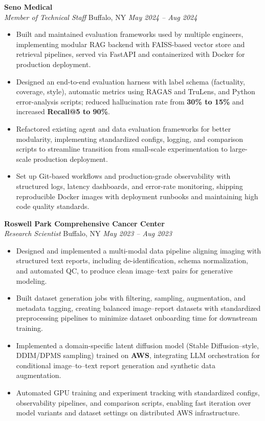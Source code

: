\vspace*{-1pt}
\item \textbf{Seno Medical}\\
\textit{Member of Technical Staff} \hfill Buffalo, NY \quad \textit{May 2024 -- Aug 2024}
\vspace*{-3pt}
\begin{itemize}[leftmargin=0.2in, topsep=1pt]
  \item Built and maintained evaluation frameworks used by multiple engineers, implementing modular RAG backend with FAISS-based vector store and retrieval pipelines, served via FastAPI and containerized with Docker for production deployment.
  \item Designed an end-to-end evaluation harness with label schema (factuality, coverage, style), automatic metrics using RAGAS and TruLens, and Python error-analysis scripts; reduced hallucination rate from \textbf{30\% to 15\%} and increased \textbf{Recall@5 to 90\%}.
  \item Refactored existing agent and data evaluation frameworks for better modularity, implementing standardized configs, logging, and comparison scripts to streamline transition from small-scale experimentation to large-scale production deployment.
  \item Set up Git-based workflows and production-grade observability with structured logs, latency dashboards, and error-rate monitoring, shipping reproducible Docker images with deployment runbooks and maintaining high code quality standards.
\end{itemize}

\vspace*{-1pt}
\item \textbf{Roswell Park Comprehensive Cancer Center}\\
\textit{Research Scientist} \hfill Buffalo, NY \quad \textit{May 2023 -- Aug 2023}
\vspace*{-3pt}
\begin{itemize}[leftmargin=0.2in, topsep=1pt]
  \item Designed and implemented a multi-modal data pipeline aligning imaging with structured text reports, including de-identification, schema normalization, and automated QC, to produce clean image–text pairs for generative modeling.
  \item Built dataset generation jobs with filtering, sampling, augmentation, and metadata tagging, creating balanced image–report datasets with standardized preprocessing pipelines to minimize dataset onboarding time for downstream training.
  \item Implemented a domain-specific latent diffusion model (Stable Diffusion–style, DDIM/DPMS sampling) trained on \textbf{AWS}, integrating LLM orchestration for conditional image–to–text report generation and synthetic data augmentation.
  \item Automated GPU training and experiment tracking with standardized configs, observability pipelines, and comparison scripts, enabling fast iteration over model variants and dataset settings on distributed AWS infrastructure.
\end{itemize}
